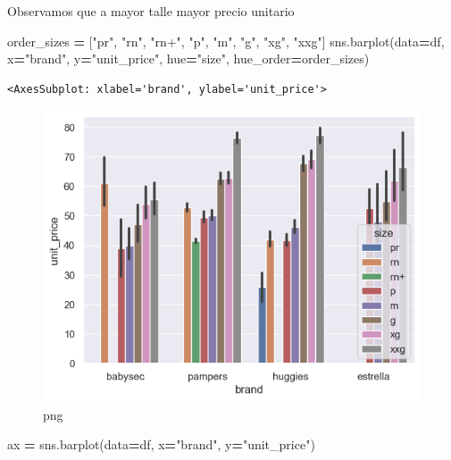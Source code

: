 \documentclass[
]{article}
\newenvironment{Shaded}{\begin{snugshade}}{\end{snugshade}}
\newcommand{\NormalTok}[1]{#1}
\newcommand{\OperatorTok}[1]{\textcolor[rgb]{0.81,0.36,0.00}{\textbf{#1}}}
\newcommand{\StringTok}[1]{\textcolor[rgb]{0.31,0.60,0.02}{#1}}
\begin{document}
Observamos que a mayor talle mayor precio unitario

\begin{Shaded}
\begin{Highlighting}[]
\NormalTok{order\_sizes }\OperatorTok{=}\NormalTok{ [}\StringTok{"pr"}\NormalTok{, }\StringTok{"rn"}\NormalTok{, }\StringTok{"rn+"}\NormalTok{, }\StringTok{"p"}\NormalTok{, }\StringTok{"m"}\NormalTok{, }\StringTok{"g"}\NormalTok{, }\StringTok{"xg"}\NormalTok{, }\StringTok{"xxg"}\NormalTok{]}
\NormalTok{sns.barplot(data}\OperatorTok{=}\NormalTok{df, x}\OperatorTok{=}\StringTok{"brand"}\NormalTok{, y}\OperatorTok{=}\StringTok{"unit\_price"}\NormalTok{, hue}\OperatorTok{=}\StringTok{"size"}\NormalTok{, hue\_order}\OperatorTok{=}\NormalTok{order\_sizes)}
\end{Highlighting}
\end{Shaded}

\begin{verbatim}
<AxesSubplot: xlabel='brand', ylabel='unit_price'>
\end{verbatim}

\begin{figure}
\centering
\includegraphics{output_10_1.png}
\caption{png}
\end{figure}

\begin{Shaded}
\begin{Highlighting}[]
\NormalTok{ax }\OperatorTok{=}\NormalTok{ sns.barplot(data}\OperatorTok{=}\NormalTok{df, x}\OperatorTok{=}\StringTok{"brand"}\NormalTok{, y}\OperatorTok{=}\StringTok{"unit\_price"}\NormalTok{)}
\end{Highlighting}
\end{Shaded}
\end{document}
